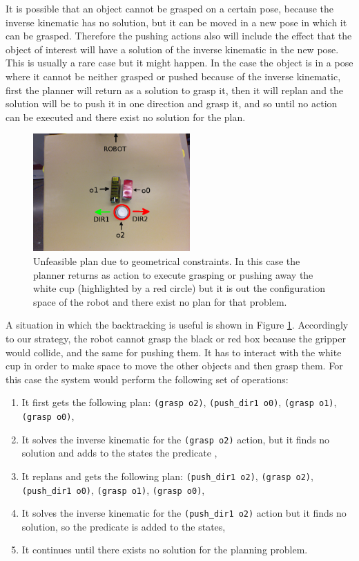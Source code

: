 It is possible that an object cannot be grasped on a certain pose, because the inverse kinematic has no solution, but it can be moved in a new pose in which it can be grasped. Therefore the pushing actions also will include the effect that the object of interest will have a solution of the inverse kinematic in the new pose. This is usually a rare case but it might happen.  In the case the object is in a pose where it cannot be neither grasped or pushed because of the inverse kinematic, first the planner will return as a solution to grasp it, then it will replan and the solution will be to push it in one direction and grasp it, and so until no action can be executed and there exist no solution for the plan. 

\begin{figure}[tb]
\centering
\includegraphics[width=6cm]{Img/backtracking/image4.png}
\caption{Unfeasible plan due to geometrical constraints. In this case the planner returns as action to execute grasping or pushing away the white cup (highlighted by a red circle) but it is out the configuration space of the robot and there exist no plan for that problem.} \label{fig:backtracking1}
\end{figure}

A situation in which the backtracking is useful is shown in Figure \ref{fig:backtracking1}. Accordingly to our strategy, the robot cannot grasp the black or red box because the gripper would collide, and the same for pushing them. It has to interact with the white cup in order to make space to move the other objects and then grasp them. For this case the system would perform the following set of operations:
\begin{enumerate}
\item It first gets the following plan: \texttt{(grasp o2)}, \texttt{(push\_dir1 o0)}, \texttt{(grasp o1)}, \texttt{(grasp o0)},

\item It solves the inverse kinematic for the \texttt{(grasp o2)} action, but it finds no solution and adds to the states the predicate , 

\item It replans and gets the following plan: \texttt{(push\_dir1 o2)}, \texttt{(grasp o2)}, \texttt{(push\_dir1 o0)}, \texttt{(grasp o1)}, \texttt{(grasp o0)},

\item  It solves the inverse kinematic for the \texttt{(push\_dir1 o2)} action  but it finds no solution, so the predicate  is added to the states,

\item It continues until there exists no solution for the planning problem.
\end{enumerate}

